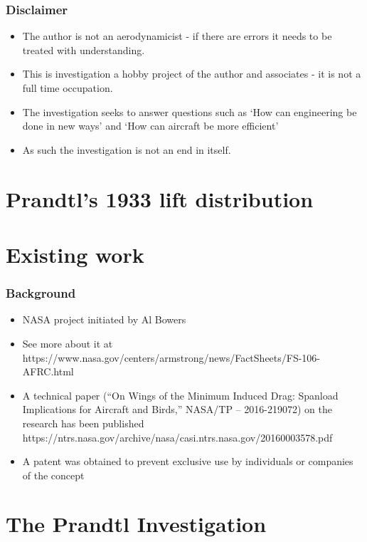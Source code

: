 \documentclass{beamer}
\begin{document}
\begin{frame}
\frametitle{Disclaimer}

\begin{itemize}
\item The author is not an aerodynamicist - if there are errors it needs to be treated with understanding.
\item This is investigation a hobby project of the author and associates - it is not a full time occupation.  
\item The investigation seeks to answer questions such as `How can engineering be done in new ways' and `How can aircraft be more efficient'
\item As such the investigation is not an end in itself.
\end{itemize}

\end{frame}




\section{Prandtl's 1933 lift distribution}


\section{Existing work}


\begin{frame}
\frametitle{Background}
\begin{itemize}
\item NASA project initiated by Al Bowers
\item See more about it at https://www.nasa.gov/centers/armstrong/news/FactSheets/FS-106-AFRC.html
\item A technical paper (“On Wings of the Minimum Induced Drag: Spanload Implications for Aircraft and Birds,” NASA/TP – 2016-219072) on the research has been published
https://ntrs.nasa.gov/archive/nasa/casi.ntrs.nasa.gov/20160003578.pdf
\item A patent was obtained to prevent exclusive use by individuals or companies of the concept
\end{itemize}
\end{frame}




\section{The Prandtl Investigation}
\end{document}

